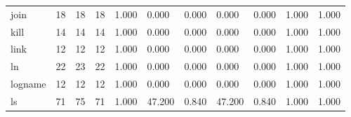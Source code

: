 \begin{longtable}{lp{1.8cm}p{1.8cm}p{1.8cm}p{1.8cm}p{1.8cm}p{1.8cm}p{1.8cm}p{1.8cm}p{1.8cm}p{1.8cm}}
join      &                           18 &                 18 &                                18 &                                      1.000 &                                  0.000 &                                        0.000 &                             0.000 &                                   0.000 &                              1.000 &                                              1.000 \\
kill      &                           14 &                 14 &                                14 &                                      1.000 &                                  0.000 &                                        0.000 &                             0.000 &                                   0.000 &                              1.000 &                                              1.000 \\
link      &                           12 &                 12 &                                12 &                                      1.000 &                                  0.000 &                                        0.000 &                             0.000 &                                   0.000 &                              1.000 &                                              1.000 \\
ln        &                           22 &                 23 &                                22 &                                      1.000 &                                  0.000 &                                        0.000 &                             0.000 &                                   0.000 &                              1.000 &                                              1.000 \\
logname   &                           12 &                 12 &                                12 &                                      1.000 &                                  0.000 &                                        0.000 &                             0.000 &                                   0.000 &                              1.000 &                                              1.000 \\
ls        &                           71 &                 75 &                                71 &                                      1.000 &                                 47.200 &                                        0.840 &                            47.200 &                                   0.840 &                              1.000 &                                              1.000 \\

\end{longtable}
